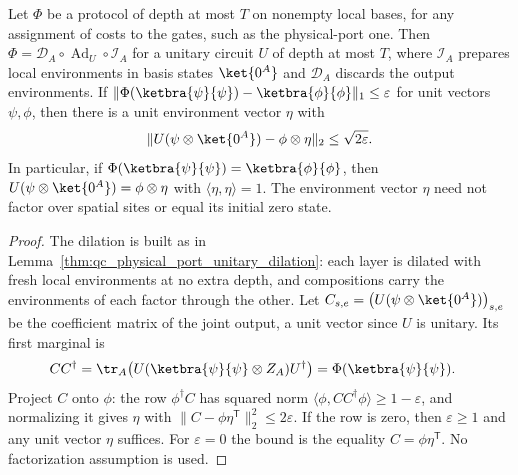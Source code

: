 \begin{lemma}
    \label{thm:qc_physical_port_pure_output}
    \leanok
    Let $\Phi$ be a protocol of depth at most $T$ on nonempty local bases, for
    any assignment of costs to the gates, such as the physical-port one. Then
    $\Phi=\mathcal D_A\circ\operatorname{Ad}_U\circ\mathcal I_A$ for a
    unitary circuit $U$ of depth at most $T$, where $\mathcal I_A$ prepares
    local environments in basis states $\ket{0^A}$ and $\mathcal D_A$ discards
    the output environments. If
    $\|\Phi(\ketbra{\psi}{\psi})-\ketbra{\phi}{\phi}\|_1\le\varepsilon$
    for unit vectors $\psi,\phi$, then there is a unit environment vector
    $\eta$ with
    \[
        \|U(\psi\otimes\ket{0^A})-\phi\otimes\eta\|_2\le\sqrt{2\varepsilon}.
    \]
    In particular, if $\Phi(\ketbra{\psi}{\psi})=\ketbra{\phi}{\phi}$,
    then $U(\psi\otimes\ket{0^A})=\phi\otimes\eta$ with
    $\langle\eta,\eta\rangle=1$. The environment vector $\eta$ need not
    factor over spatial sites or equal its initial zero state.
\end{lemma}
\begin{proof}\leanok
    The dilation is built as in Lemma~\ref{thm:qc_physical_port_unitary_dilation}:
    each layer is dilated with fresh local environments at no extra depth, and
    compositions carry the environments of each factor through the other.
    Let $C_{s,e}=\bigl(U(\psi\otimes\ket{0^A})\bigr)_{s,e}$ be the
    coefficient matrix of the joint output, a unit vector since $U$ is
    unitary. Its first marginal is
    \begin{align}
        CC^\dagger & =\tr_A\bigl(U(\ketbra{\psi}{\psi}\otimes Z_A)U^\dagger\bigr)
        =\Phi(\ketbra{\psi}{\psi}).\notag
    \end{align}
    Project $C$ onto $\phi$: the row $\phi^\dagger C$ has squared norm
    $\langle\phi,CC^\dagger\phi\rangle\ge1-\varepsilon$, and normalizing
    it gives $\eta$ with $\|C-\phi\eta^{\mathsf T}\|_2^2\le2\varepsilon$.
    If the row is zero, then $\varepsilon\ge1$ and any unit vector $\eta$
    suffices. For $\varepsilon=0$ the bound is the equality
    $C=\phi\eta^{\mathsf T}$. No factorization assumption is used.
\end{proof}


